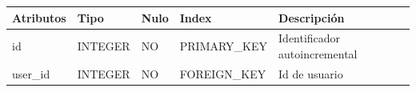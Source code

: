 \documentclass[12pt,a4paperpaper,]{report}
\begin{document}
\begin{longtable}[]{@{}lllll@{}}
\toprule
\begin{minipage}[b]{0.21\columnwidth}\raggedright\strut
Atributos\strut
\end{minipage} & \begin{minipage}[b]{0.19\columnwidth}\raggedright\strut
Tipo\strut
\end{minipage} & \begin{minipage}[b]{0.16\columnwidth}\raggedright\strut
Nulo\strut
\end{minipage} & \begin{minipage}[b]{0.19\columnwidth}\raggedright\strut
Index\strut
\end{minipage} & \begin{minipage}[b]{0.11\columnwidth}\raggedright\strut
Descripción\strut
\end{minipage}\tabularnewline
\midrule
\endhead
\begin{minipage}[t]{0.21\columnwidth}\raggedright\strut
id\strut
\end{minipage} & \begin{minipage}[t]{0.19\columnwidth}\raggedright\strut
INTEGER\strut
\end{minipage} & \begin{minipage}[t]{0.16\columnwidth}\raggedright\strut
NO\strut
\end{minipage} & \begin{minipage}[t]{0.19\columnwidth}\raggedright\strut
PRIMARY\_KEY\strut
\end{minipage} & \begin{minipage}[t]{0.11\columnwidth}\raggedright\strut
Identificador autoincremental\strut
\end{minipage}\tabularnewline
\begin{minipage}[t]{0.21\columnwidth}\raggedright\strut
user\_id\strut
\end{minipage} & \begin{minipage}[t]{0.19\columnwidth}\raggedright\strut
INTEGER\strut
\end{minipage} & \begin{minipage}[t]{0.16\columnwidth}\raggedright\strut
NO\strut
\end{minipage} & \begin{minipage}[t]{0.19\columnwidth}\raggedright\strut
FOREIGN\_KEY\strut
\end{minipage} & \begin{minipage}[t]{0.11\columnwidth}\raggedright\strut
Id de usuario\strut
\end{minipage}\tabularnewline

\end{longtable}
\end{document}
